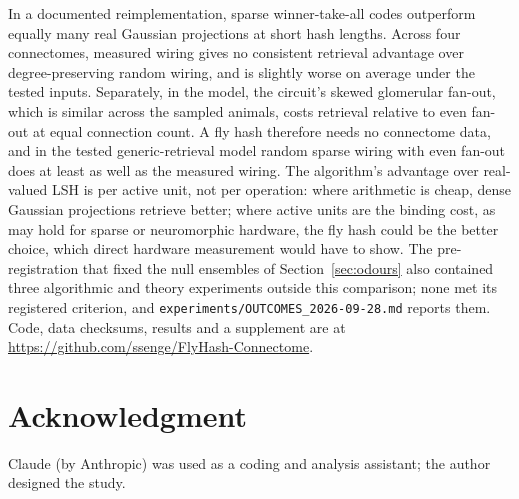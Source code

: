 \documentclass[conference]{IEEEtran}
\begin{document}
In a documented reimplementation, sparse winner-take-all codes outperform
equally many real Gaussian projections at short hash lengths. Across four
connectomes, measured wiring gives no consistent retrieval advantage over
degree-preserving random wiring, and is slightly worse on average under the tested inputs. Separately, in the model, the circuit's skewed glomerular fan-out, which is similar across the sampled animals, costs retrieval relative to even fan-out at equal connection count. A fly hash
therefore needs no connectome data, and in the tested generic-retrieval model
random sparse wiring with even fan-out does at least as well as the measured
wiring. The algorithm's advantage over real-valued LSH is per active unit, not
per operation: where arithmetic is cheap, dense Gaussian projections retrieve
better; where active units are the binding cost, as may hold for sparse or
neuromorphic hardware, the fly hash could be the better choice, which direct
hardware measurement would have to show. The pre-registration that fixed the
null ensembles of Section~\ref{sec:odours} also contained three algorithmic and
theory experiments outside this comparison; none met its registered criterion, and \texttt{experiments/OUTCOMES\_2026-09-28.md} reports them.
Code, data checksums, results and a supplement are at
\url{https://github.com/ssenge/FlyHash-Connectome}.

\section*{Acknowledgment}

Claude (by Anthropic) was used as a coding and analysis assistant; the author
designed the study.
\end{document}
